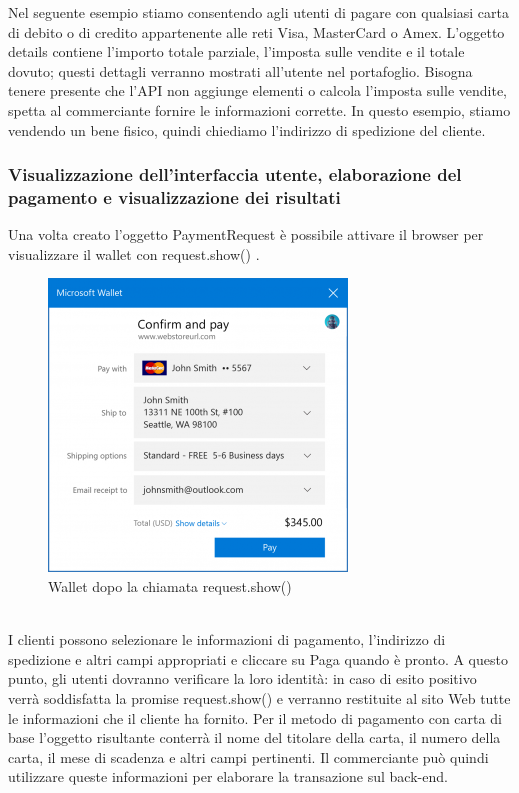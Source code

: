 \documentclass[11pt ,a4paper , twoside , openright ]{article}
\begin{document}
Nel seguente esempio stiamo consentendo agli utenti di pagare con qualsiasi carta di debito o di credito appartenente alle reti Visa, MasterCard o Amex. L'oggetto details contiene l'importo totale parziale, l'imposta sulle vendite e il totale dovuto; questi dettagli verranno mostrati all'utente nel portafoglio. Bisogna tenere presente che l'API non aggiunge elementi o calcola l'imposta sulle vendite, spetta al commerciante fornire le informazioni corrette. In questo esempio, stiamo vendendo un bene fisico, quindi chiediamo l'indirizzo di spedizione del cliente.

\subsubsection{Visualizzazione dell'interfaccia utente, elaborazione del pagamento e visualizzazione dei risultati}
Una volta creato l'oggetto PaymentRequest è possibile attivare il browser per visualizzare il wallet con request.show() \cite{rif12}. 
\begin{figure}[h]
	\centering
	\includegraphics[width=0.5\linewidth]{wallet1}
	\caption{Wallet dopo la chiamata request.show()}
	\label{fig: Wallet dopo la chiamata request.show()}
\end{figure}
\\
\pagebreak
I clienti possono  selezionare le informazioni di pagamento, l'indirizzo di spedizione e altri campi appropriati e cliccare su Paga quando è pronto. A questo punto, gli utenti dovranno verificare la loro identità: in caso di esito positivo verrà soddisfatta la promise request.show() e verranno restituite al sito Web tutte le informazioni che il cliente ha fornito. Per il metodo di pagamento con carta di base l'oggetto risultante conterrà il nome del titolare della carta, il numero della carta, il mese di scadenza e altri campi pertinenti. Il commerciante può quindi utilizzare queste informazioni per elaborare la transazione sul back-end.
\end{document}
